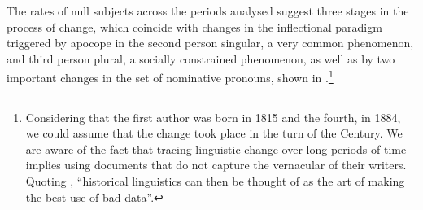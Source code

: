 \documentclass[output=paper]{langsci/langscibook}
\begin{document}
The rates of null subjects across the periods analysed suggest three stages in
the process of change, which coincide with changes in the inflectional paradigm
triggered by apocope in the second person singular, a very common phenomenon,
and third person plural, a socially constrained phenomenon, as well as by two
important changes in the set of nominative pronouns, shown in
.\footnote{Considering that the first author was born in
    1815 and the fourth, in 1884, we could assume that the change took place in
    the turn of the Century. We are aware of the fact that tracing linguistic
    change over long periods of time implies using documents that do not
    capture the vernacular of their writers. Quoting
    \parencite[11]{Labov1994}, “historical linguistics can then be thought of
    as the art of making the best use of bad data”.}
\end{document}
